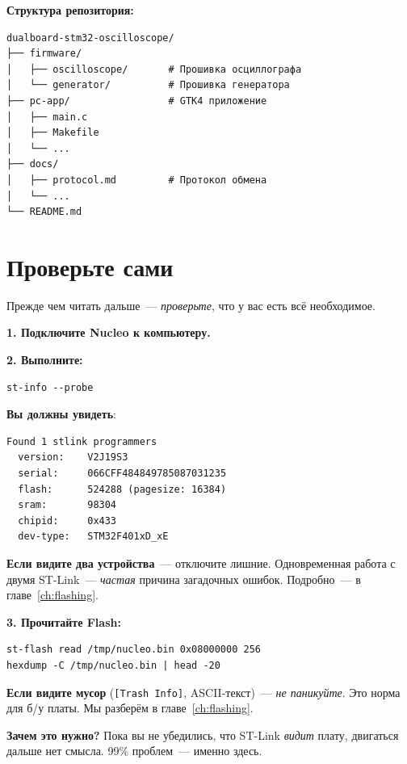 \textbf{Структура репозитория:}

\begin{verbatim}
dualboard-stm32-oscilloscope/
├── firmware/
│   ├── oscilloscope/       # Прошивка осциллографа
│   └── generator/          # Прошивка генератора
├── pc-app/                 # GTK4 приложение
│   ├── main.c
│   ├── Makefile
│   └── ...
├── docs/
│   ├── protocol.md         # Протокол обмена
│   └── ...
└── README.md
\end{verbatim}

\section{Проверьте сами}
\label{sec:intro-check}

Прежде чем читать дальше~--- \emph{проверьте}, что
у вас есть всё необходимое.

\textbf{1. Подключите Nucleo к компьютеру.}

\textbf{2. Выполните:}

\begin{verbatim}
st-info --probe
\end{verbatim}

\textbf{Вы должны увидеть}:

\begin{verbatim}
Found 1 stlink programmers
  version:    V2J19S3
  serial:     066CFF484849785087031235
  flash:      524288 (pagesize: 16384)
  sram:       98304
  chipid:     0x433
  dev-type:   STM32F401xD_xE
\end{verbatim}

\begin{warnbox}
\textbf{Если видите два устройства}~--- отключите лишние.
Одновременная работа с двумя ST-Link~--- \emph{частая}
причина загадочных ошибок. Подробно~--- в главе~\ref{ch:flashing}.
\end{warnbox}

\textbf{3. Прочитайте Flash:}

\begin{verbatim}
st-flash read /tmp/nucleo.bin 0x08000000 256
hexdump -C /tmp/nucleo.bin | head -20
\end{verbatim}

\textbf{Если видите мусор} (\texttt{[Trash Info]}, ASCII-текст)~---
\emph{не паникуйте}. Это норма для б/у платы. Мы разберём
в главе~\ref{ch:flashing}.

\begin{ideabox}
\textbf{Зачем это нужно?} Пока вы не убедились, что
ST-Link \emph{видит} плату, двигаться дальше нет смысла.
99\% проблем~--- именно здесь.
\end{ideabox}


